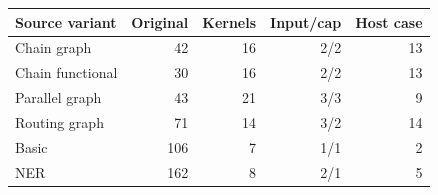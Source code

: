 \begin{tabular}{lrrrr}
\hline
Source variant & Original & Kernels & Input/cap & Host case \\
\hline
Chain graph & 42 & 16 & 2/2 & 13 \\
Chain functional & 30 & 16 & 2/2 & 13 \\
Parallel graph & 43 & 21 & 3/3 & 9 \\
Routing graph & 71 & 14 & 3/2 & 14 \\
Basic & 106 & 7 & 1/1 & 2 \\
NER & 162 & 8 & 2/1 & 5 \\
\hline
\end{tabular}
